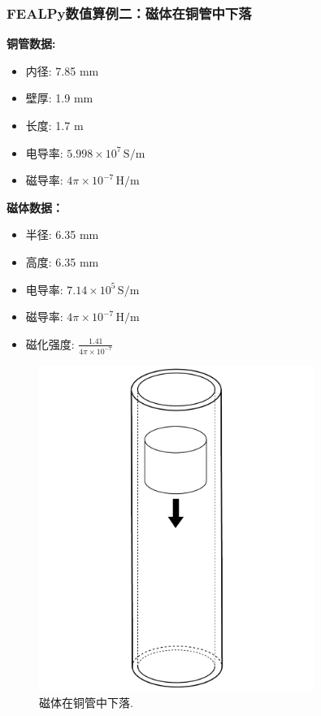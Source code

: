 \documentclass[notheorems,serif]{beamer}
\begin{document}
\begin{frame}
    \frametitle{FEALPy数值算例二：磁体在铜管中下落}
\begin{minipage}[b]{0.49\linewidth}
\textbf{铜管数据:}
\begin{itemize}
    \item 内径: 7.85 mm
    \item 壁厚: 1.9 mm
    \item 长度: 1.7 m
    \item 电导率: \( 5.998 \times 10^7 \, \text{S/m} \)
    \item 磁导率: \( 4\pi \times 10^{-7} \, \text{H/m} \)
\end{itemize}

\textbf{磁体数据：}
\begin{itemize}
    \item 半径: 6.35 mm
    \item 高度: 6.35 mm
    \item 电导率: \( 7.14 \times 10^5 \, \text{S/m} \)
    \item 磁导率: \( 4\pi \times 10^{-7} \, \text{H/m} \)
    \item 磁化强度: \( \frac{1.41}{4\pi \times 10^{-7}} \)
\end{itemize}
\vspace{10pt}
\end{minipage}
\hfill
\begin{minipage}[b]{0.49\linewidth}
    \centering
    \begin{figure}[htpb]
        \centering
        \includegraphics[width=0.8\textwidth]{../figures/movingmaxwell/magnet_falling.pdf}
        \caption{磁体在铜管中下落.}
    \end{figure}
\end{minipage}


\end{frame}
\end{document}

